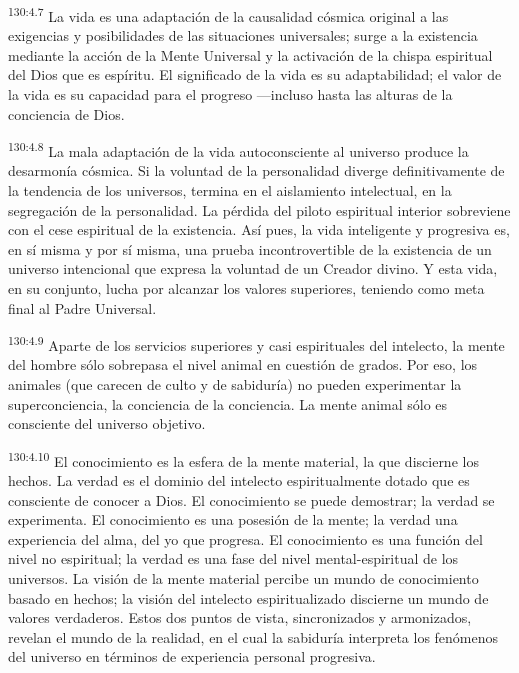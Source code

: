 \par
\textsuperscript{130:4.7} La vida es una adaptación de la causalidad cósmica original a las exigencias y posibilidades de las situaciones universales; surge a la existencia mediante la acción de la Mente Universal y la activación de la chispa espiritual del Dios que es espíritu. El significado de la vida es su adaptabilidad; el valor de la vida es su capacidad para el progreso ---incluso hasta las alturas de la conciencia de Dios.

\par
\textsuperscript{130:4.8} La mala adaptación de la vida autoconsciente al universo produce la desarmonía cósmica. Si la voluntad de la personalidad diverge definitivamente de la tendencia de los universos, termina en el aislamiento intelectual, en la segregación de la personalidad. La pérdida del piloto espiritual interior sobreviene con el cese espiritual de la existencia. Así pues, la vida inteligente y progresiva es, en sí misma y por sí misma, una prueba incontrovertible de la existencia de un universo intencional que expresa la voluntad de un Creador divino. Y esta vida, en su conjunto, lucha por alcanzar los valores superiores, teniendo como meta final al Padre Universal.

\par
\textsuperscript{130:4.9} Aparte de los servicios superiores y casi espirituales del intelecto, la mente del hombre sólo sobrepasa el nivel animal en cuestión de grados. Por eso, los animales (que carecen de culto y de sabiduría) no pueden experimentar la superconciencia, la conciencia de la conciencia. La mente animal sólo es consciente del universo objetivo.

\par
\textsuperscript{130:4.10} El conocimiento es la esfera de la mente material, la que discierne los hechos. La verdad es el dominio del intelecto espiritualmente dotado que es consciente de conocer a Dios. El conocimiento se puede demostrar; la verdad se experimenta. El conocimiento es una posesión de la mente; la verdad una experiencia del alma, del yo que progresa. El conocimiento es una función del nivel no espiritual; la verdad es una fase del nivel mental-espiritual de los universos. La visión de la mente material percibe un mundo de conocimiento basado en hechos; la visión del intelecto espiritualizado discierne un mundo de valores verdaderos. Estos dos puntos de vista, sincronizados y armonizados, revelan el mundo de la realidad, en el cual la sabiduría interpreta los fenómenos del universo en términos de experiencia personal progresiva.

